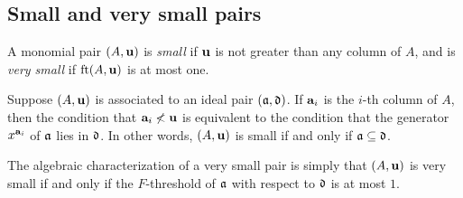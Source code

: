 \documentclass{amsart}
\begin{document}
\subsection{Small and very small pairs}

\begin{definition}
A monomial pair $(A, \mathbf{u})$ is \emph{small} if $\mathbf{u}$ is not greater than any column of $A$, and is \emph{very small} if $\operatorname{ft}(A, \mathbf{u})$ is at most one.
\end{definition}

\begin{remark}
\label{algebraic small and very small: R}
  Suppose $(A, \mathbf{u})$ is associated to an ideal pair $(\mathfrak{a}, \mathfrak{d})$.  If $\mathbf{a}_i$ is the $i$-th column of $A$, then the condition that $\mathbf{a}_i \not < \mathbf{u}$ is equivalent to the condition that the generator $x^{\mathbf{a}_i}$ of $\mathfrak{a}$ lies in $\mathfrak{d}$.  In other words, $(A, \mathbf{u})$ is small if and only if $\mathfrak{a} \subseteq \mathfrak{d}$.

The algebraic characterization of a very small pair is simply that $(A, \mathbf{u})$ is very small if and only if the $F$-threshold of $\mathfrak{a}$ with respect to $\mathfrak{d}$ is at most $1$.
\end{remark}
\end{document}
